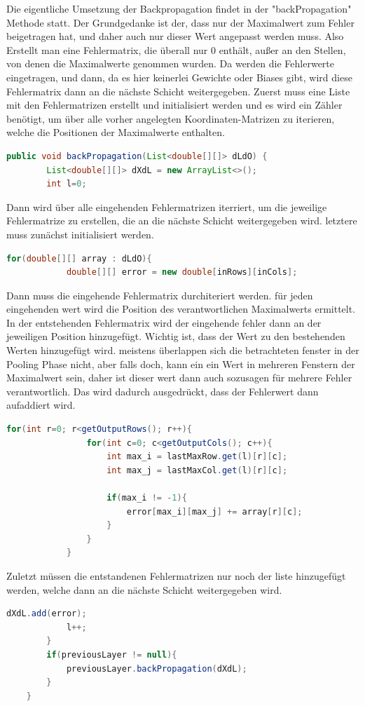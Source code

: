 \documentclass[12pt]{article}
\begin{document}
Die eigentliche Umsetzung der Backpropagation findet in der "backPropagation" Methode statt. Der Grundgedanke ist der, dass nur der Maximalwert zum Fehler beigetragen hat, und daher auch nur dieser Wert angepasst werden muss. Also Erstellt man eine Fehlermatrix, die überall nur 0 enthält, außer an den Stellen, von denen die Maximalwerte genommen wurden. Da werden die Fehlerwerte eingetragen, und dann, da es hier keinerlei Gewichte oder Biases gibt, wird diese Fehlermatrix dann an die nächste Schicht weitergegeben.
Zuerst muss eine Liste mit den Fehlermatrizen erstellt und initialisiert werden und es wird ein Zähler benötigt, um über alle vorher angelegten Koordinaten-Matrizen zu iterieren, welche die Positionen der Maximalwerte enthalten.
\begin{lstlisting}[language=Java]
    public void backPropagation(List<double[][]> dLdO) {
        List<double[][]> dXdL = new ArrayList<>();
        int l=0;
\end{lstlisting}
Dann wird über alle eingehenden Fehlermatrizen iterriert, um die jeweilige Fehlermatrize zu erstellen, die an die nächste Schicht weitergegeben wird. letztere muss zunächst initialisiert werden.  
\begin{lstlisting}[language=Java]
        for(double[][] array : dLdO){
            double[][] error = new double[inRows][inCols];
\end{lstlisting}
Dann muss die eingehende Fehlermatrix durchiteriert werden. für jeden eingehenden wert wird die Position des verantwortlichen Maximalwerts ermittelt. In der entstehenden Fehlermatrix wird der eingehende fehler dann an der jeweiligen Position hinzugefügt. Wichtig ist, dass der Wert zu den bestehenden Werten hinzugefügt wird. meistens überlappen sich die betrachteten fenster in der Pooling Phase nicht, aber falls doch, kann ein ein Wert in mehreren Fenstern der Maximalwert sein, daher ist dieser wert dann auch sozusagen für mehrere Fehler verantwortlich. Das wird dadurch ausgedrückt, dass der Fehlerwert dann aufaddiert wird.
\begin{lstlisting}[language=Java]
            for(int r=0; r<getOutputRows(); r++){
                for(int c=0; c<getOutputCols(); c++){
                    int max_i = lastMaxRow.get(l)[r][c];
                    int max_j = lastMaxCol.get(l)[r][c];

                    if(max_i != -1){
                        error[max_i][max_j] += array[r][c];
                    }
                }
            }
\end{lstlisting}
Zuletzt müssen die entstandenen Fehlermatrizen nur noch der liste hinzugefügt werden, welche dann an die nächste Schicht weitergegeben wird.  
\begin{lstlisting}[language=Java]
            dXdL.add(error);
            l++;
        }
        if(previousLayer != null){
            previousLayer.backPropagation(dXdL);
        }
    }
\end{lstlisting}
\end{document}
